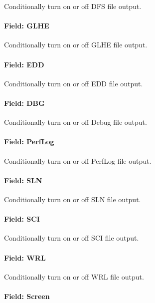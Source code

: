 Conditionally turn on or off DFS file output.

\paragraph{Field: GLHE}\label{field-glhe}

Conditionally turn on or off GLHE file output.

\paragraph{Field: EDD}\label{field-edd}

Conditionally turn on or off EDD file output.

\paragraph{Field: DBG}\label{field-dbg}

Conditionally turn on or off Debug file output.

\paragraph{Field: PerfLog}\label{field-perf-log}

Conditionally turn on or off PerfLog file output.

\paragraph{Field: SLN}\label{field-sln}

Conditionally turn on or off SLN file output.

\paragraph{Field: SCI}\label{field-sci}

Conditionally turn on or off SCI file output.

\paragraph{Field: WRL}\label{field-wrl}

Conditionally turn on or off WRL file output.

\paragraph{Field: Screen}\label{field-screen}

